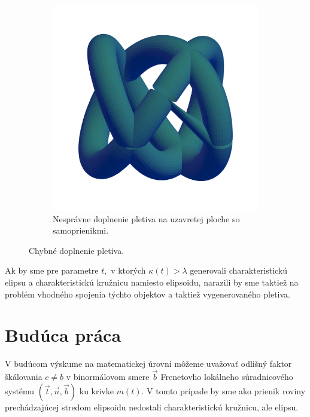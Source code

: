 \begin{figure}[h]
\begin{subfigure}[b]{0.49\textwidth}
        \includegraphics[width=\textwidth]{images/interpolacia_diery.png}
        	\caption{Nesprávne doplnenie pletiva na uzavretej ploche so samoprienikmi.}
        \label{fig:spojenie_kruznic_2}
    \end{subfigure}
    	\caption[Chybné doplnenie pletiva.]{Chybné doplnenie pletiva.}
    \label{fig:spojenie_kruznic}
\end{figure}
%
Ak by sme pre parametre $t,$ v ktorých $\kappa(t) > \lambda $ generovali charakteristickú elipsu a charakteristickú kružnicu namiesto elipsoidu, narazili by sme taktiež na problém vhodného spojenia týchto objektov a taktiež vygenerovaného pletiva.
\section{Budúca práca}
V budúcom výskume na matematickej úrovni môžeme uvažovať odlišný faktor škálovania $c \neq b$ v binormálovom smere $\vec{b}$ Frenetovho lokálneho súradnicového systému $(\vec{t}, \vec{n}, \vec{b})$ ku krivke $m(t)$. V tomto prípade by sme ako prienik roviny prechádzajúcej stredom elipsoidu nedostali charakteristickú kružnicu, ale elipsu.

